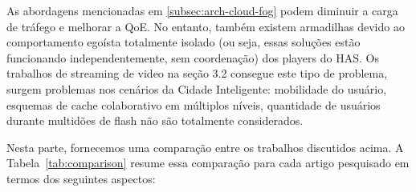 As abordagens mencionadas em \autoref{subsec:arch-cloud-fog} podem diminuir a carga de tráfego 
e melhorar a QoE. No entanto, também existem armadilhas devido ao comportamento egoísta totalmente isolado (ou seja, essas soluções estão funcionando independentemente, sem coordenação) dos players do HAS.%
Os trabalhos de streaming de video na seção 3.2 consegue este tipo de problema, surgem problemas nos cenários da Cidade Inteligente: mobilidade do usuário, esquemas de cache colaborativo em múltiplos níveis, quantidade de usuários durante multidões de flash não são totalmente considerados. %


Nesta parte, fornecemos uma comparação entre os trabalhos discutidos acima.
A Tabela~\ref{tab:comparison} resume essa comparação para cada artigo pesquisado em termos dos seguintes aspectos:

